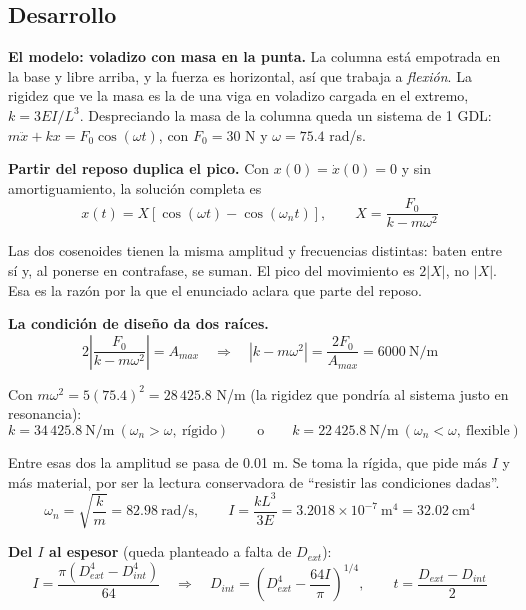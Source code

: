 \documentclass[12pt,letterpaper]{article}
\begin{document}
\subsection{Desarrollo}

\textbf{El modelo: voladizo con masa en la punta.} La columna está empotrada en la
base y libre arriba, y la fuerza es horizontal, así que trabaja a \emph{flexión}. La
rigidez que ve la masa es la de una viga en voladizo cargada en el extremo,
$k = 3EI/L^3$. Despreciando la masa de la columna queda un sistema de 1 GDL:
$m\ddot{x} + kx = F_0\cos(\omega t)$, con $F_0 = 30$ N y $\omega = 75.4$ rad/s.

\textbf{Partir del reposo duplica el pico.} Con $x(0) = \dot{x}(0) = 0$ y sin
amortiguamiento, la solución completa es
\begin{equation}
x(t) = X\left[\cos(\omega t) - \cos(\omega_n t)\right],
\qquad X = \frac{F_0}{k - m\omega^2}
\end{equation}

Las dos cosenoides tienen la misma amplitud y frecuencias distintas: baten entre sí y,
al ponerse en contrafase, se suman. El pico del movimiento es $2|X|$, no $|X|$. Esa es
la razón por la que el enunciado aclara que parte del reposo.

\textbf{La condición de diseño da dos raíces.}
\begin{equation}
2\left|\frac{F_0}{k - m\omega^2}\right| = A_{max}
\quad\Longrightarrow\quad
\left|k - m\omega^2\right| = \frac{2F_0}{A_{max}} = 6000\ \text{N/m}
\end{equation}

Con $m\omega^2 = 5(75.4)^2 = 28\,425.8$ N/m (la rigidez que pondría al sistema justo
en resonancia):
\begin{equation}
k = 34\,425.8\ \text{N/m}\ (\omega_n > \omega,\ \text{rígido})
\qquad\text{o}\qquad
k = 22\,425.8\ \text{N/m}\ (\omega_n < \omega,\ \text{flexible})
\end{equation}

Entre esas dos la amplitud se pasa de 0.01 m. Se toma la rígida, que pide más $I$ y
más material, por ser la lectura conservadora de ``resistir las condiciones dadas''.
\begin{equation}
\omega_n = \sqrt{\frac{k}{m}} = 82.98\ \text{rad/s}, \qquad
I = \frac{kL^3}{3E} = 3.2018\times10^{-7}\ \text{m}^4 = 32.02\ \text{cm}^4
\end{equation}

\textbf{Del $I$ al espesor} (queda planteado a falta de $D_{ext}$):
\begin{equation}
I = \frac{\pi\left(D_{ext}^4 - D_{int}^4\right)}{64}
\quad\Longrightarrow\quad
D_{int} = \left(D_{ext}^4 - \frac{64I}{\pi}\right)^{1/4},
\qquad t = \frac{D_{ext} - D_{int}}{2}
\end{equation}
\end{document}
